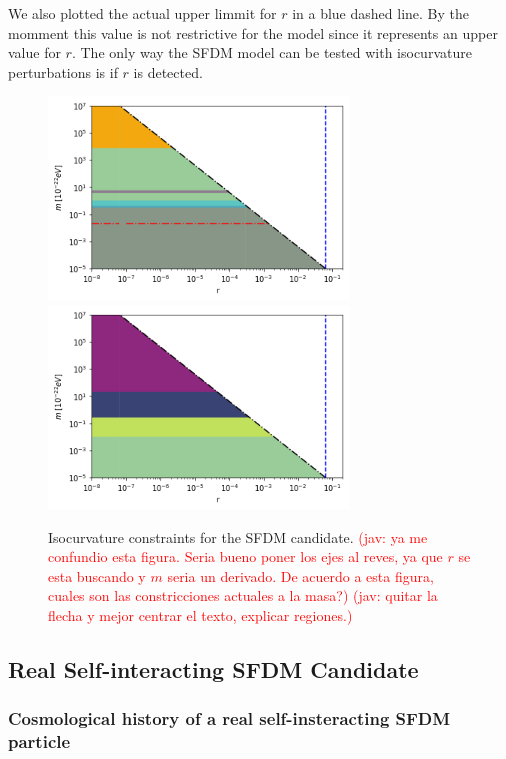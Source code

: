 \documentclass[amssymb,twocolumn,prd,nofootinbib,showpacs]{revtex4-1}
\newcommand{\jav}[1]{\textcolor{red}{(jav: #1)}}
\begin{document}
We also plotted the actual upper limmit for $r$ in a blue dashed line. By the momment this value is not restrictive for the model since it represents an upper value for $r$. The only way the SFDM model can be tested with
isocurvature perturbations is if $r$ is detected.
\begin{figure}[h!]
\includegraphics[width=8cm]{SFDMconstraints.png}
\includegraphics[width=8cm]{SFDMconstraints2.png}
\caption{Isocurvature constraints for the SFDM candidate.
\jav{ya me confundio esta figura. Seria bueno poner los ejes al reves, ya que $r$ se esta buscando 
y $m$ seria un derivado. De acuerdo a esta figura, cuales son las constricciones actuales a la masa?}
\jav{quitar la flecha y mejor centrar el texto, explicar regiones.}
}\label{constraintsSFDM}
\end{figure}
\subsection{Real Self-interacting SFDM Candidate}
\subsubsection{Cosmological history of a real self-insteracting SFDM particle}
\end{document}
